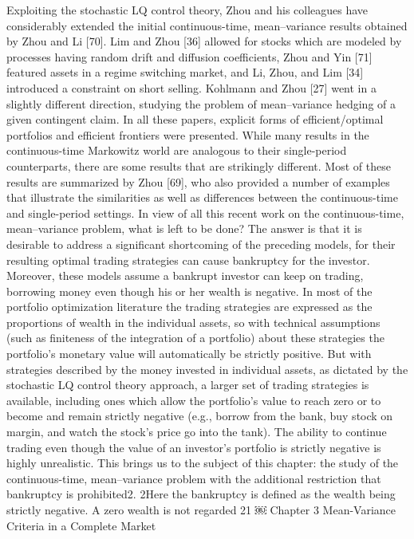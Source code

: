 Exploiting the stochastic LQ control theory, Zhou and his colleagues have considerably extended the initial continuous-time, mean–variance results obtained by Zhou and Li [70]. Lim and Zhou [36] allowed for stocks which are modeled by processes having random drift and diffusion coefficients, Zhou and Yin [71] featured assets in a regime switching market, and Li, Zhou, and Lim [34] introduced a constraint on short selling. Kohlmann and Zhou [27] went in a slightly different direction, studying the problem of mean–variance hedging of a given contingent claim. In all these papers, explicit forms of efficient/optimal portfolios and efficient frontiers were presented. While many results in the continuous-time Markowitz world are analogous to their single-period counterparts, there are some results that are strikingly different. Most of these results are summarized by Zhou [69], who also provided a number of examples that illustrate the similarities as well as differences between the continuous-time and single-period settings.
In view of all this recent work on the continuous-time, mean–variance problem, what is left to be done? The answer is that it is desirable to address a significant shortcoming of the preceding models, for their resulting optimal trading strategies can cause bankruptcy for the investor. Moreover, these models assume a bankrupt investor can keep on trading, borrowing money even though his or her wealth is negative. In most of the portfolio optimization literature the trading strategies are expressed as the proportions of wealth in the individual assets, so with technical assumptions (such as finiteness of the integration of a portfolio) about these strategies the portfolio’s monetary value will automatically be strictly positive. But with strategies described by the money invested in individual assets, as dictated by the stochastic LQ control theory approach, a larger set of trading strategies is available, including ones which allow the portfolio’s value to reach zero or to become and remain strictly negative (e.g., borrow from the bank, buy stock on margin, and watch the stock’s price go into the tank). The ability to continue trading even though the value of an investor’s portfolio is strictly negative is highly unrealistic. This brings us to the subject of this chapter: the study of the continuous-time, mean–variance problem with the additional restriction that bankruptcy is prohibited2.
2Here the bankruptcy is defined as the wealth being strictly negative. A zero wealth is not regarded 21
￼
Chapter 3 Mean-Variance Criteria in a Complete Market
